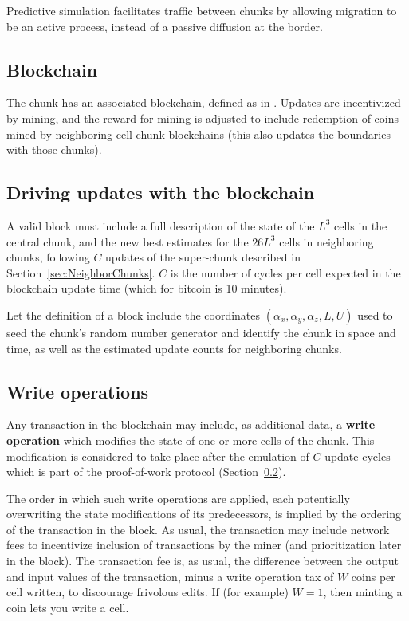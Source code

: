 \documentclass{article}
\begin{document}
Predictive simulation facilitates traffic between chunks
by allowing migration to be an active process, instead of a passive diffusion at the border.

\subsection{Blockchain}
\label{sec:Blockchain}

The chunk has an associated blockchain, defined as in \cite{Nakamoto2008}.
Updates are incentivized by mining,
and the reward for mining is adjusted to include redemption of coins mined by neighboring cell-chunk blockchains
(this also updates the boundaries with those chunks).

\subsection{Driving updates with the blockchain}
\label{sec:ProofOfWork}

A valid block must include a full description of the state of the $L^3$ cells in the central chunk,
and the new best estimates for the $26L^3$ cells in neighboring chunks,
following $C$ updates of the super-chunk described in Section~\ref{sec:NeighborChunks}.
$C$ is the number of cycles per cell expected in the blockchain update time
(which for bitcoin is 10 minutes).

Let the definition of a block include the coordinates $(\alpha_x,\alpha_y,\alpha_z,L,U)$
used to seed the chunk's random number generator and identify the chunk in space and time,
as well as the estimated update counts for neighboring chunks.

\subsection{Write operations}

Any transaction in the blockchain may include, as additional data,
a {\bf write operation} which modifies the state of one or more cells of the chunk.
This modification is considered to take place after the emulation of $C$ update cycles
which is part of the proof-of-work protocol (Section~\ref{sec:ProofOfWork}).

The order in which such write operations are applied,
each potentially overwriting the state modifications of its predecessors,
is implied by the ordering of the transaction in the block.
As usual, the transaction may include network fees to incentivize inclusion of transactions
by the miner
(and prioritization later in the block).
The transaction fee is, as usual, the difference between the output and input values of the transaction,
minus a write operation tax of $W$ coins per cell written,
to discourage frivolous edits.
If (for example) $W=1$, then minting a coin lets you write a cell.
\end{document}
